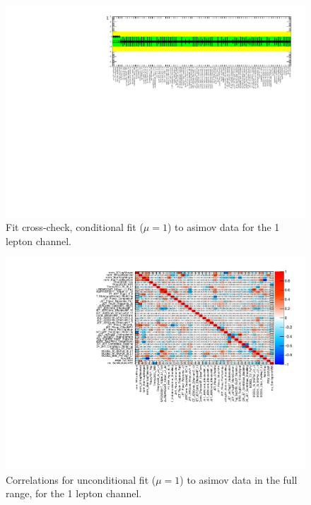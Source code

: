 \begin{figure}[ht]
      \centering
        \includegraphics[width=\linewidth]{figures/Fit_fcc/AsimovFit/NP_allExceptGammas.pdf}
        \caption{Fit cross-check, conditional fit ($\mu=1$) to asimov data for the 1 lepton channel.}
       \label{fig:fit_1lep_fcc_asimov}
\end{figure}

\begin{figure}[ht]
      \centering
        \includegraphics[width=\linewidth]{figures/Fit_fcc/AsimovFit_uncon/corr_HighCorrNoMCStat.pdf}
        \caption{Correlations for unconditional fit ($\mu=1$) to asimov data in the full range, for the 1 lepton channel.}
       \label{fig:fit_1lep_corr_all}
\end{figure}

